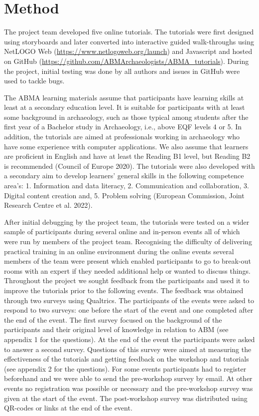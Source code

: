 \documentclass[
]{article}
\begin{document}
\hypertarget{method}{%
\section{Method}\label{method}}

The project team developed five online tutorials. The tutorials were first designed using storyboards and later converted into interactive guided walk-throughs using NetLOGO Web (\url{https://www.netlogoweb.org/launch}) and Javascript and hosted on GitHub (\url{https://github.com/ABMArchaeologists/ABMA_tutorials}). During the project, initial testing was done by all authors and issues in GitHub were used to tackle bugs.

The ABMA learning materials assume that participants have learning skills at least at a secondary education level. It is suitable for participants with at least some background in archaeology, such as those typical among students after the first year of a Bachelor study in Archaeology, i.e., above EQF levels 4 or 5. In addition, the tutorials are aimed at professionals working in archaeology who have some experience with computer applications. We also assume that learners are proficient in English and have at least the Reading B1 level, but Reading B2 is recommended (Council of Europe 2020). The tutorials were also developed with a secondary aim to develop learners' general skills in the following competence area's: 1. Information and data literacy, 2. Communication and collaboration, 3. Digital content creation and, 5. Problem solving (European Commission, Joint Research Centre et al. 2022).

After initial debugging by the project team, the tutorials were tested on a wider sample of participants during several online and in-person events all of which were run by members of the project team. Recognising the difficulty of delivering practical training in an online environment during the online events several members of the team were present which enabled participants to go to break-out rooms with an expert if they needed additional help or wanted to discuss things. Throughout the project we sought feedback from the participants and used it to improve the tutorials prior to the following events. The feedback was obtained through two surveys using Qualtrics. The participants of the events were asked to respond to two surveys: one before the start of the event and one completed after the end of the event. The first survey focused on the background of the participants and their original level of knowledge in relation to ABM (see appendix 1 for the questions). At the end of the event the participants were asked to answer a second survey. Questions of this survey were aimed at measuring the effectiveness of the tutorials and getting feedback on the workshop and tutorials (see appendix 2 for the questions). For some events participants had to register beforehand and we were able to send the pre-workshop survey by email. At other events no registration was possible or necessary and the pre-workshop survey was given at the start of the event. The post-workshop survey was distributed using QR-codes or links at the end of the event.
\end{document}
